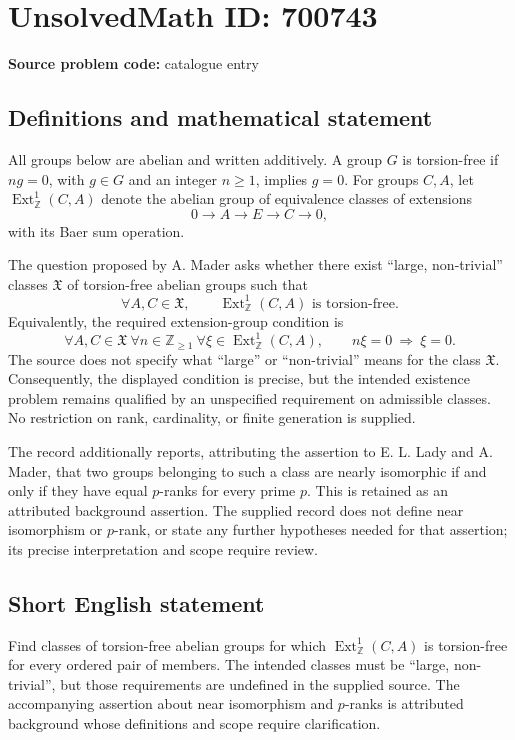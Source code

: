 \documentclass[11pt]{article}
\newcommand{\Z}{\mathbb{Z}}
\begin{document}
\section*{UnsolvedMath ID: 700743}
\textbf{Source problem code:} catalogue entry
\subsection{Definitions and mathematical statement}
All groups below are abelian and written additively. A group \(G\) is torsion-free if \(ng=0\), with \(g\in G\) and an integer \(n\geq 1\), implies \(g=0\). For groups \(C,A\), let \(\operatorname{Ext}_{\Z}^{1}(C,A)\) denote the abelian group of equivalence classes of extensions
\[
0\longrightarrow A\longrightarrow E\longrightarrow C\longrightarrow 0,
\]
with its Baer sum operation.

The question proposed by A. Mader asks whether there exist ``large, non-trivial'' classes \(\mathfrak X\) of torsion-free abelian groups such that
\[
\forall A,C\in\mathfrak X,\qquad
\operatorname{Ext}_{\Z}^{1}(C,A)\text{ is torsion-free}.
\]
Equivalently, the required extension-group condition is
\[
\forall A,C\in\mathfrak X\ \forall n\in\Z_{\geq 1}\ \forall \xi\in\operatorname{Ext}_{\Z}^{1}(C,A),
\qquad n\xi=0\ \Longrightarrow\ \xi=0.
\]
The source does not specify what ``large'' or ``non-trivial'' means for the class \(\mathfrak X\). Consequently, the displayed condition is precise, but the intended existence problem remains qualified by an unspecified requirement on admissible classes. No restriction on rank, cardinality, or finite generation is supplied.

The record additionally reports, attributing the assertion to E. L. Lady and A. Mader, that two groups belonging to such a class are nearly isomorphic if and only if they have equal \(p\)-ranks for every prime \(p\). This is retained as an attributed background assertion. The supplied record does not define near isomorphism or \(p\)-rank, or state any further hypotheses needed for that assertion; its precise interpretation and scope require review.
\subsection{Short English statement}
Find classes of torsion-free abelian groups for which \(\operatorname{Ext}_{\Z}^{1}(C,A)\) is torsion-free for every ordered pair of members. The intended classes must be ``large, non-trivial'', but those requirements are undefined in the supplied source. The accompanying assertion about near isomorphism and \(p\)-ranks is attributed background whose definitions and scope require clarification.
\end{document}
